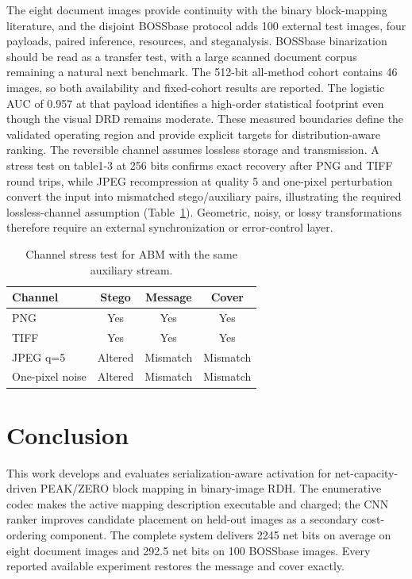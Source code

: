 \documentclass[a4paper,fleqn]{cas-dc}
\newcommand{\RevisionAddBegin}{\begingroup\color{revisionblue}}
\newcommand{\RevisionAddEnd}{\endgroup}
\begin{document}
The eight document images provide continuity with the binary block-mapping
literature, and the disjoint BOSSbase protocol adds 100 external test images,
four payloads, paired inference, resources, and steganalysis. BOSSbase
\RevisionAddBegin
binarization should be read as a transfer test, with a large scanned document
corpus remaining a natural next benchmark. The 512-bit all-method cohort
contains 46 images, so both
\RevisionAddEnd
availability and fixed-cohort results are reported. The logistic AUC of 0.957
at that payload identifies a high-order statistical footprint even though the
\RevisionAddBegin
visual DRD remains moderate. These measured boundaries define the validated
\RevisionAddEnd
operating region and provide explicit targets for distribution-aware ranking.
The reversible channel assumes lossless storage and transmission. A stress test
on table1-3 at 256 bits confirms exact recovery after PNG and TIFF round trips,
while JPEG recompression at quality 5 and one-pixel perturbation convert the
input into mismatched stego/auxiliary pairs, illustrating the required
lossless-channel assumption (Table~\ref{tab:channel-stress}). Geometric,
noisy, or lossy transformations therefore require an external synchronization
or error-control layer.

\begin{table}[t]
\centering
\caption{Channel stress test for ABM with the same auxiliary stream.}
\label{tab:channel-stress}
\begin{tabular}{@{}lccc@{}}
\toprule
\textbf{Channel} & \textbf{Stego} &
\textbf{Message} & \textbf{Cover} \\
\midrule
PNG & Yes & Yes & Yes \\
TIFF & Yes & Yes & Yes \\
JPEG q=5 & Altered & Mismatch & Mismatch \\
One-pixel noise & Altered & Mismatch & Mismatch \\
\bottomrule
\end{tabular}
\end{table}

\section{Conclusion}
\label{sec:conclusion}

\RevisionAddBegin
This work develops and evaluates serialization-aware activation for
net-capacity-driven PEAK/ZERO block mapping in binary-image RDH. The
enumerative codec makes the active mapping description executable and charged;
the CNN ranker improves candidate placement on held-out images as a secondary
cost-ordering component. The complete system delivers 2245 net bits on average
on eight document images and 292.5 net bits on 100 BOSSbase images. Every
reported available experiment restores the message and cover exactly.
\RevisionAddEnd
\end{document}
